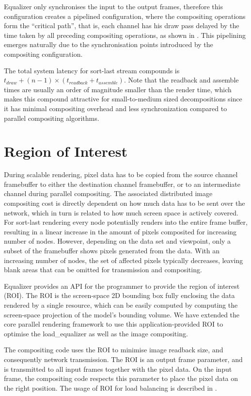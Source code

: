 Equalizer only synchronises the input to the output frames, therefore this
configuration creates a pipelined configuration, where the compositing
operations form the ``critical path'', that is, each channel has his draw pass
delayed by the time taken by all preceding compositing operations, as shown in
. This pipelining emerges naturally due to the
synchronisation points introduced by the compositing configuration.

The total system latency for sort-last stream compounds is $t_{draw} + (n -
1)\times (t_{readback} + t_{assemble})$. Note that the readback and assemble
times are usually an order of magnitude smaller than the render time, which
makes this compound attractive for small-to-medium sized decompositions since
it has minimal compositing overhead and less synchronization compared to
parallel compositing algorithms.

\section{Region of Interest}

During scalable rendering, pixel data has to be copied from the source channel
framebuffer to either the destination channel framebuffer, or to an
intermediate channel during parallel compositing. The associated distributed
image compositing cost is directly dependent on how much data has to be sent
over the network, which in turn is related to how much screen space is actively
covered. For sort-last rendering every node potentially renders into the entire
frame buffer, resulting in a linear increase in the amount of pixels composited
for increasing number of nodes. However, depending on the data set and
viewpoint, only a subset of the framebuffer shows pixels generated from the
data. With an increasing number of nodes, the set of affected pixels typically
decreases, leaving blank areas that can be omitted for transmission and
compositing.

Equalizer provides an API for the programmer to provide the region of interest
(ROI). The ROI is the screen-space 2D bounding box fully enclosing the data
rendered by a single resource, which can be easily computed by computing the
screen-space projection of the model's bounding volume. We have extended the
core parallel rendering framework to use this application-provided ROI to
optimise the \textsf{load\_equalizer} as well as the image compositing.

The compositing code uses the ROI to minimise image readback size, and
consequently network transmission. The ROI is an output frame parameter, and is
transmitted to all input frames together with the pixel data. On the input
frame, the compositing code respects this parameter to place the pixel data on
the right position. The usage of ROI for load balancing is described in
.

